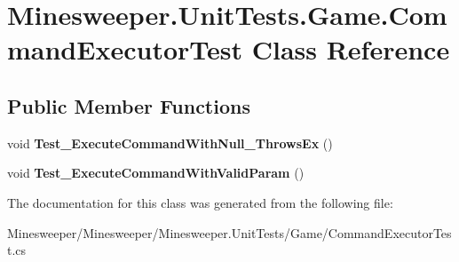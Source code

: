 \hypertarget{class_minesweeper_1_1_unit_tests_1_1_game_1_1_command_executor_test}{\section{Minesweeper.\+Unit\+Tests.\+Game.\+Command\+Executor\+Test Class Reference}
\label{class_minesweeper_1_1_unit_tests_1_1_game_1_1_command_executor_test}
}
\subsection*{Public Member Functions}
\begin{DoxyCompactItemize}
\item 
\hypertarget{class_minesweeper_1_1_unit_tests_1_1_game_1_1_command_executor_test_aff012c5a3aa7de383757f4acc7bdc25b}{void {\bfseries Test\+\_\+\+Execute\+Command\+With\+Null\+\_\+\+Throws\+Ex} ()}\label{class_minesweeper_1_1_unit_tests_1_1_game_1_1_command_executor_test_aff012c5a3aa7de383757f4acc7bdc25b}

\item 
\hypertarget{class_minesweeper_1_1_unit_tests_1_1_game_1_1_command_executor_test_a49bbecf2083e7cd6a3ee605b87744aab}{void {\bfseries Test\+\_\+\+Execute\+Command\+With\+Valid\+Param} ()}\label{class_minesweeper_1_1_unit_tests_1_1_game_1_1_command_executor_test_a49bbecf2083e7cd6a3ee605b87744aab}

\end{DoxyCompactItemize}


The documentation for this class was generated from the following file\+:\begin{DoxyCompactItemize}
\item 
Minesweeper/\+Minesweeper/\+Minesweeper.\+Unit\+Tests/\+Game/Command\+Executor\+Test.\+cs\end{DoxyCompactItemize}
